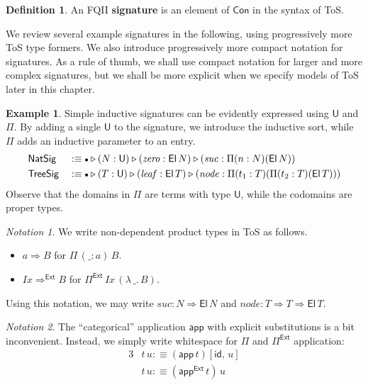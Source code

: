 \documentclass[12pt,a4paper,twoside,openany]{book}
\theoremstyle{remark}
\newtheorem{notation}{Notation}
\theoremstyle{definition}
\newtheorem{mydefinition}{Definition}
\newtheorem{myexample}{Example}
\theoremstyle{theorem}
\newcommand{\mi}[1]{\mathit{#1}}
\newcommand{\ms}[1]{\mathsf{#1}}
\newcommand{\id}{\mathsf{id}}
\newcommand{\Con}{\mathsf{Con}}
\newcommand{\U}{\mathsf{U}}
\newcommand{\El}{\mathsf{El}}
\newcommand{\ext}{\triangleright}
\newcommand{\emptycon}{\scaleobj{.75}\bullet}
\newcommand{\Pii}{\Pi}
\newcommand{\funi}{\Rightarrow}
\newcommand{\appi}{\mathsf{app}}
\newcommand{\fune}{\Rightarrow^{\ms{Ext}}}
\newcommand{\Pie}{\Pi^{\mathsf{Ext}}}
\newcommand{\appe}{\mathsf{app^{Ext}}}
\newcommand{\app}{\ms{app}}
\newcommand{\defn}{:\equiv}
\begin{document}
\begin{mydefinition} An FQII \textbf{signature} is an element of $\Con$ in the syntax of ToS.
\end{mydefinition}
We review several example signatures in the following, using progressively
more ToS type formers.  We also introduce progressively more compact notation
for signatures. As a rule of thumb, we shall use compact notation for larger and
more complex signatures, but we shall be more explicit when we specify models of
ToS later in this chapter.
\begin{myexample}
  Simple inductive signatures can be evidently expressed using $\U$ and
  $\Pi$. By adding a single $\U$ to the signature, we introduce the inductive
  sort, while $\Pi$ adds an inductive parameter to an entry.
  \begin{alignat*}{3}
    & \ms{NatSig} &&\defn \emptycon \ext (N : \U) \ext (\mi{zero} : \El\,N)
                        \ext (\mi{suc} : \Pi (n : N) (\El\,N))\\
    & \ms{TreeSig} &&\defn \emptycon \ext (T : \U) \ext (\mi{leaf} : \El\,T)
                         \ext (\mi{node} : \Pi (t_1 : T) (\Pi (t_2 : T) (\El\,T)))
  \end{alignat*}
  Observe that the domains in $\Pi$ are terms with type $\U$, while the codomains are proper types.
\end{myexample}

\begin{notation} We write non-dependent product types in ToS as follows.
  \begin{itemize}
  \item $a \funi B$ for $\Pi\,(\_ : a)\,B$.
  \item $\mi{Ix} \fune B$ for $\Pie\,\mi{Ix}\,(\lambda\,\_.\,B)$.
  \end{itemize}
\end{notation}
\noindent
Using this notation, we may write $\mi{suc} : N \funi \El\,N$ and $\mi{node} : T
\funi T \funi \El\,T$.

\begin{notation}
The ``categorical'' application $\app$ with explicit substitutions is a bit
inconvenient. Instead, we simply write whitespace for $\Pii$ and $\Pie$
application:
\begin{alignat*}{3}
  & t\,u \defn (\appi\,t)[\id,\,u]\\
  & t\,u \defn (\appe\,t)\,u
\end{alignat*}
\end{notation}
\end{document}
